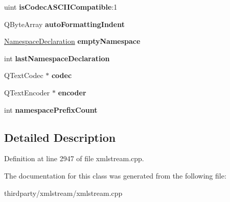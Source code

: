 \begin{DoxyCompactItemize}
uint {\bfseries is\+Codec\+A\+S\+C\+I\+I\+Compatible}\+:1
\item 
\mbox{\label{class_xml_stream_writer_private_aaffd05c73b3898c154975352cabfc2b6}} 
Q\+Byte\+Array {\bfseries auto\+Formatting\+Indent}
\item 
\mbox{\label{class_xml_stream_writer_private_a8e1bf388ed50fd1824274898f365b63f}} 
\hyperlink{struct_xml_stream_private_tag_stack_1_1_namespace_declaration}{Namespace\+Declaration} {\bfseries empty\+Namespace}
\item 
\mbox{\label{class_xml_stream_writer_private_a48be472e73ee01b0179b66671bd802ac}} 
int {\bfseries last\+Namespace\+Declaration}
\item 
\mbox{\label{class_xml_stream_writer_private_a671847b1ef63d05554b7a10f64453f41}} 
Q\+Text\+Codec $\ast$ {\bfseries codec}
\item 
\mbox{\label{class_xml_stream_writer_private_a7b933f9c8aadbd55398a6a34163d4f9f}} 
Q\+Text\+Encoder $\ast$ {\bfseries encoder}
\item 
\mbox{\label{class_xml_stream_writer_private_a828f27f545ed0471314fae65ddb3b65b}} 
int {\bfseries namespace\+Prefix\+Count}
\end{DoxyCompactItemize}


\subsection{Detailed Description}


Definition at line 2947 of file xmlstream.\+cpp.



The documentation for this class was generated from the following file\+:\begin{DoxyCompactItemize}
\item 
thirdparty/xmlstream/xmlstream.\+cpp\end{DoxyCompactItemize}
